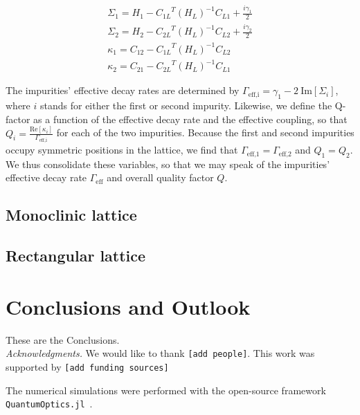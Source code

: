 \documentclass[aps,pra,superscriptaddress,twocolumn]{revtex4-1}
\newcommand{\re}{\mathrm{Re}}
\newcommand{\im}{\mathrm{Im}}
\newcommand{\commentSO}[1]{\texttt{\color{orange}[#1]}}
\newcommand{\commentTP}[1]{\texttt{\color{green}[#1]}}
\begin{document}
\begin{subequations}
    \begin{align}
        \Sigma_1 = H_1 - {C_{1L}}^T (H_L)^{-1} C_{L1} + \frac{i \gamma_1}{2} \\
        \Sigma_2 = H_2 - {C_{2L}}^T (H_L)^{-1} C_{L2} + \frac{i \gamma_2}{2} \\
        \kappa_1 = C_{12} - {C_{1L}}^T (H_L)^{-1} C_{L2} \\
        \kappa_2 = C_{21} - {C_{2L}}^T (H_L)^{-1} C_{L1} 
    \end{align}
\end{subequations}

The impurities' effective decay rates are determined by $\Gamma_\text{eff,i} = \gamma_1 - 2~\im[\Sigma_i]$, where $i$ stands for either the first or second impurity. Likewise, we define the Q-factor as a function of the effective decay rate and the effective coupling, so that $ Q_i = \frac{\re[\kappa_i]}{\Gamma_\text{eff,i}} $ for each of the two impurities. Because the first and second impurities occupy symmetric positions in the lattice, we find that $\Gamma_\text{eff,1} = \Gamma_\text{eff,2}$ and $Q_1 = Q_2$. We thus consolidate these variables, so that we may speak of the impurities' effective decay rate $\Gamma_\text{eff}$ and overall quality factor $Q$. 




\subsection{Monoclinic lattice}


\subsection{Rectangular lattice}


\section{Conclusions and Outlook}\label{sec:conclusion}

These are the Conclusions.\\[2ex]

\emph{Acknowledgments.} We would like to thank \commentSO{add people}. This work was supported by \commentSO{add funding sources}

The numerical simulations were performed with the open-source framework \texttt{QuantumOptics.jl}~\cite{kramer_quantumopticsjl_2018}.




\end{document}
